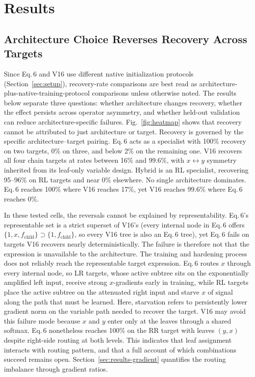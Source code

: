 \section{Results}
\label{sec:results}

\subsection{Architecture Choice Reverses Recovery Across Targets}
\label{sec:results-interaction}

Since Eq.\,6 and V16 use different native initialization
protocols (Section~\ref{sec:setup}), recovery-rate comparisons
are best read as architecture-plus-native-training-protocol
comparisons unless otherwise noted.  The results below separate
three questions: whether architecture changes recovery, whether
the effect persists across operator asymmetry, and whether
held-out validation can reduce architecture-specific failures.
Fig.~\ref{fig:heatmap} shows that recovery cannot be attributed
to just architecture or target.  Recovery is governed by the
specific architecture--target pairing.
Eq.\,6 acts as a specialist with 100\% recovery on two targets, 0\% on
three, and below 2\% on the remaining one.  V16 recovers all four
chain targets at rates between 16\% and 99.6\%, with $x \leftrightarrow
y$ symmetry inherited from its leaf-only variable design.  Hybrid is
an RL specialist, recovering 95--96\% on RL targets and near 0\%
elsewhere.  No single architecture dominates.  Eq.\,6 reaches 100\%
where V16 reaches 17\%, yet V16 reaches 99.6\% where Eq.\,6 reaches
0\%.

In these tested cells, the reversals cannot be explained by
representability.
Eq.\,6's representable set is a strict superset of V16's (every
internal node in Eq.\,6 offers $\{1,x,f_{\text{child}}\} \supset
\{1,f_{\text{child}}\}$, so every V16 tree is also an Eq.\,6
tree), yet Eq.\,6 fails on targets V16 recovers nearly
deterministically.  The failure is therefore not that the
expression is unavailable to the architecture.  The training and
hardening process does not reliably reach the representable
target expression.  Eq.\,6 routes
$x$ through every internal node, so LR targets, whose active
subtree sits on the exponentially amplified left input, receive
strong $x$-gradients early in training, while RL targets place the
active subtree on the attenuated right input and starve $x$ of
signal along the path that must be learned.  Here, starvation
refers to persistently lower gradient norm on the variable path
needed to recover the target.  V16 may avoid this
failure mode because $x$ and $y$ enter only at the leaves through a
shared softmax.  Eq.\,6 nonetheless reaches 100\% on the RR target
with leaves $(y,x)$ despite right-side routing at both levels.
This indicates that leaf assignment interacts with routing
pattern, and that a full account of which combinations succeed
remains open.  Section~\ref{sec:results-gradient}
quantifies the routing imbalance through gradient ratios.

